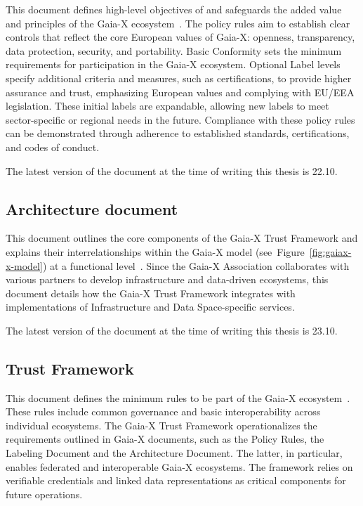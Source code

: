 This document defines high-level objectives of and safeguards the added value and principles of the Gaia-X ecosystem~\cite{gaiax_policy_rules}.
The policy rules aim to establish clear controls that reflect the core European values of Gaia-X: openness, transparency, data protection, security, and portability.
Basic Conformity sets the minimum requirements for participation in the Gaia-X ecosystem.
Optional Label levels specify additional criteria and measures, such as certifications, to provide higher assurance and trust, emphasizing European values and complying with EU/EEA legislation.
These initial labels are expandable, allowing new labels to meet sector-specific or regional needs in the future.
Compliance with these policy rules can be demonstrated through adherence to established standards, certifications, and codes of conduct.

The latest version of the document at the time of writing this thesis is 22.10.

\subsection{Architecture document}\label{subsec:architecture-document}

This document outlines the core components of the Gaia-X Trust Framework and explains their interrelationships within the Gaia-X model (see~Figure~\ref{fig:gaiax-x-model}) at a functional level~\cite{gaiax_architecture_document}.
Since the Gaia-X Association collaborates with various partners to develop infrastructure and data-driven ecosystems, this document details how the Gaia-X Trust Framework integrates with implementations of Infrastructure and Data Space-specific services.

The latest version of the document at the time of writing this thesis is 23.10.

\subsection{Trust Framework}\label{subsec:trust-framework}

This document defines the minimum rules to be part of the Gaia-X ecosystem~\cite{gaiax_trust_framework}.
These rules include common governance and basic interoperability across individual ecosystems.
The Gaia-X Trust Framework operationalizes the requirements outlined in Gaia-X documents, such as the Policy Rules, the Labeling Document and the Architecture Document. %
The latter, in particular, enables federated and interoperable Gaia-X ecosystems.
The framework relies on verifiable credentials and linked data representations as critical components for future operations.

